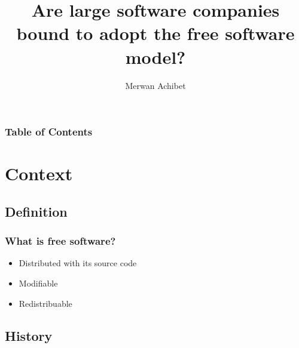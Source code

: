 \documentclass{beamer}
\title{Are large software companies bound to adopt the free software model?}
\author{Merwan Achibet}
\institute{Université du Havre}
\date{}
\begin{document}
\maketitle

\begin{frame}
  \frametitle{Table of Contents}
  \tableofcontents
\end{frame}

\section{Context}

\subsection{Definition}

\begin{frame}

  \frametitle{What is free software?}

  \begin{itemize}
    \item<1->{Distributed with its source code}
    \item<2->{Modifiable}
    \item<3->{Redistribuable}
  \end{itemize}

  \pause

  \vfill



\end{frame}

\subsection{History}
\end{document}
